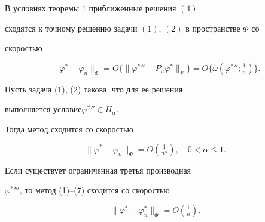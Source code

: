  


 


\begin{thm} 


В условиях теоремы $1$ приближенные решения $(4)$ 


сходятся к точному решению задачи $(1)$, $(2)$ в пространстве $\Phi$ со 


скоростью 


\begin{equation} 


\|\varphi^*-\varphi_n\|_\Phi=O\{\|\varphi^*{}''-P_n\varphi^*\|_F\}= 


O\{\omega(\varphi^*{}'';\tfrac{1}{n})\}. 


\end{equation} 


\end{thm} 


 


\begin{cor} 


Пусть задача (1), (2) такова, что для ее решения 


выполняется условие\linebreak $\varphi^*{}''\in H_\alpha$. 


Тогда метод сходится со скоростью 


$$ 


\|\varphi^*-\varphi_n\|_\Phi=O(\tfrac{1}{n^\alpha}),\quad 


0<\alpha\le1. 


$$ 


\end{cor} 


 


\begin{cor} 


Если существует ограниченная третья производная 


$\varphi^*{}'''$, то метод (1)--(7) сходится со скоростью 


$$ 


\|\varphi^*-\varphi^*_n\|_\Phi=O(\tfrac{1}{n}). 


$$ 


\end{cor} 


 


